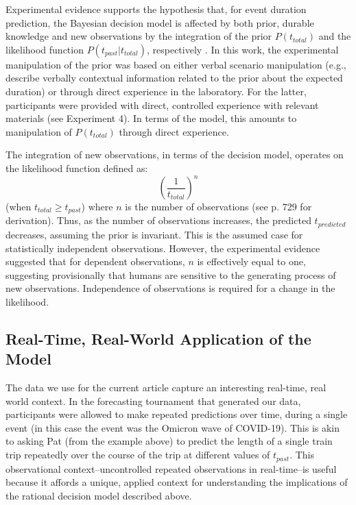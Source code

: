 \documentclass[a4paper,man,natbib]{apa6}
\begin{document}
Experimental evidence supports the hypothesis that, for event duration prediction, the Bayesian decision model is affected by both prior, durable knowledge and new observations by the integration of the prior $P(t_{total})$ and the likelihood function $P(t_{past} \vert t_{total})$, respectively \citep{GriffithsTenenbaum2011}.  In this work, the experimental manipulation of the prior was based on either verbal scenario manipulation (e.g., describe verbally contextual information related to the prior about the expected duration) or through direct experience in the laboratory. For the latter, participants were provided with direct, controlled experience with relevant materials (see \cite{GriffithsTenenbaum2011} Experiment 4).  In terms of the model, this amounts to manipulation of $P(t_{total})$ through direct experience.   

The integration of new observations, in terms of the decision model, operates on the likelihood function defined as:
\begin{equation}\label{eq:likelihoodN}
   \left(\frac{1}{t_{total}} \right)^n
\end{equation}
(when $t_{total} \ge t_{past}$) where $n$ is the number of observations (see \cite{GriffithsTenenbaum2011} p. 729 for derivation).  Thus, as the number of observations increases, the predicted $t_{predicted}$ decreases, assuming the prior is invariant.  This is the assumed case for statistically independent observations.  However, the experimental evidence suggested that for dependent observations, $n$ is effectively equal to one, suggesting provisionally that humans are sensitive to the generating process of new observations.  Independence of observations is required for a change in the likelihood.

\subsection{Real-Time, Real-World Application of the Model}
The data we use for the current article capture an interesting real-time, real world context.  In the forecasting tournament that generated our data, participants were allowed to make repeated predictions over time, during a single event (in this case the event was the Omicron wave of COVID-19).  This is akin to asking Pat (from the example above) to predict the length of a single train trip repeatedly over the course of the trip at different values of $t_{past}$. This observational context--uncontrolled repeated observations in real-time--is useful because it affords a unique, applied context for understanding the implications of the rational decision model described above.  
\end{document}
